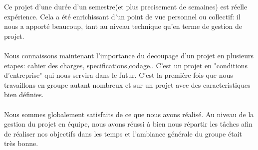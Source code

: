 \documentclass[a4]{article}
\begin{document}
	
Ce projet d'une durée d'un semestre(et plus precisement de semaines) est réelle expérience.
Cela a été enrichissant d'un point de vue personnel ou collectif:
il nous a apporté beaucoup, tant au
niveau technique qu’en terme de gestion de projet.  \\  \\
Nous connaissons maintenant l'importance du decoupage d'un projet en plusieurs etapes: cahier des charges, specifications,codage..
C'est un projet en "conditions d'entreprise" qui nous servira dans le futur.
C’est la première fois que nous travaillons en groupe autant nombreux et sur un projet avec des caracteristiques bien définies. \\ \\
Nous sommes
globalement satisfaits de ce que nous avons réalisé.
 Au niveau de la gestion du projet en équipe, nous avons réussi à bien nous répartir les
tâches afin de réaliser nos objectifs dans les temps et l'ambiance générale du groupe était très
bonne. 
	
	
	
\end{document}
